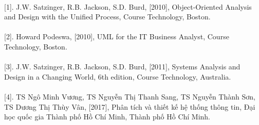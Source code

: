 \documentclass{report}
\begin{document}
\paragraph{}
[1]. J.W. Satzinger, R.B. Jackson, S.D. Burd, [2010], Object-Oriented Analysis and Design with the Unified Process, Course Technology, Boston.
\paragraph{}
[2]. Howard Podeswa, [2010], UML for the IT Business Analyst, Course Technology, Boston.
\paragraph{}
[3]. J.W. Satzinger, R.B. Jackson, S.D. Burd, [2011], Systems Analysis and Design in a Changing World, 6th edition, Course Technology, Australia.
\paragraph{}
[4]. TS Ngô Minh Vương, TS Nguyễn Thị Thanh Sang, TS Nguyễn Thành Sơn, TS Dương Thị Thùy Vân, [2017], Phân tích và thiết kế hệ thống thông tin, Đại học quốc gia Thành phố Hồ Chí Minh, Thành phố Hồ Chí Minh.
\end{document}
